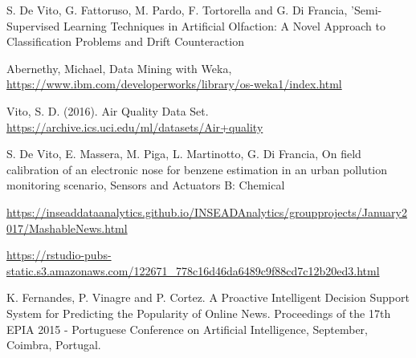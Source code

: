 \begin{thebibliography}{1}

S. De Vito, G. Fattoruso, M. Pardo, F. Tortorella and G. Di Francia, 'Semi-Supervised Learning Techniques in Artificial Olfaction: A Novel Approach to Classification Problems and Drift Counteraction

Abernethy, Michael, Data Mining with Weka, \hfill
\url{https://www.ibm.com/developerworks/library/os-weka1/index.html}

Vito, S. D. (2016). Air Quality Data Set. \url{https://archive.ics.uci.edu/ml/datasets/Air+quality}

S. De Vito, E. Massera, M. Piga, L. Martinotto, G. Di Francia, On field calibration of an electronic nose for benzene estimation in an urban pollution monitoring scenario, Sensors and Actuators B: Chemical

\url{https://inseaddataanalytics.github.io/INSEADAnalytics/groupprojects/January2017/MashableNews.html}

\url{https://rstudio-pubs-static.s3.amazonaws.com/122671_778c16d46da6489c9f88cd7c12b20ed3.html}

K. Fernandes, P. Vinagre and P. Cortez. A Proactive Intelligent Decision Support System for Predicting the Popularity of Online News. Proceedings of the 17th EPIA 2015 - Portuguese Conference on Artificial Intelligence, September, Coimbra, Portugal.

\end{thebibliography}